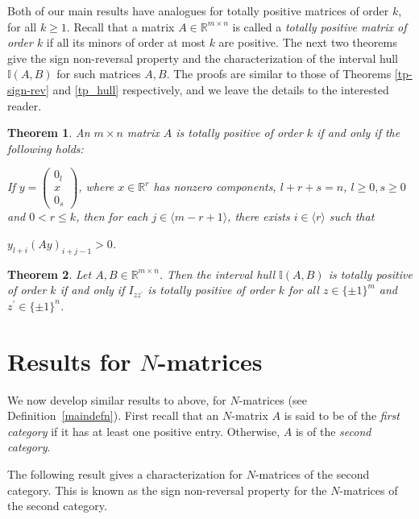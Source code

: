\documentclass[11pt]{article}
\newtheorem{theorem}{Theorem}[section]
\begin{document}
Both of our main results have analogues for totally positive matrices of
order $k$, for all $k \geq 1$. Recall that a matrix $A \in \mathbb{R}^{m
\times n}$ is called a \textit{totally positive matrix of order $k$} if
all its minors of order at most $k$ are positive.
The next two theorems give the sign non-reversal property and the
characterization of the interval hull $\mathbb{I}(A, B)$ for such matrices $A,B$. The proofs are
similar to those of Theorems \ref{tp-sign-rev} and \ref{tp_hull}
respectively, and we leave the details to the interested reader.

	\begin{theorem}\label{tp-sign-rev k}
		An $m \times n $ matrix $A$ is totally positive of order $k$ if and only if the following holds:
		
		If $y=\begin{pmatrix} 0_l\\x\\0_s \end{pmatrix}$, where  $x \in \mathbb{R}^r$ has nonzero components, $l + r + s = n$, $l \geq 0, s \geq  0$ and $0<r \leq k$, then for each $j \in \langle m-r+1 \rangle$, there exists $i \in \langle r \rangle$ such that \begin{center} $y_{l+i}(Ay)_{i+j-1} > 0$.\end{center}
		
	\end{theorem}

\begin{theorem}\label{tp_hull k}
	Let $A, B \in \mathbb{R}^{m \times n}$. Then the interval hull $\mathbb{I}(A, B)$ is  totally positive of order $k$ if and only if $I_{z z^{\prime}}$ is totally positive of order $k$ for all $z\in \{ \pm 1 \}^m$ and $z^{\prime}\in \{ \pm 1 \}^n$.
\end{theorem}


\section{Results for $N$-matrices}\label{secnmat}


 We now develop similar results to above, for $N$-matrices
(see Definition~\ref{maindefn}). First recall that an $N$-matrix $A$ is
said to be of the \textit{first category} if it has at least one positive
entry. Otherwise, $A$ is of the \textit{second category}.

The following result gives a characterization for $N$-matrices of the
second category. This is known as the sign non-reversal property for the
$N$-matrices of the second category.
\end{document}
